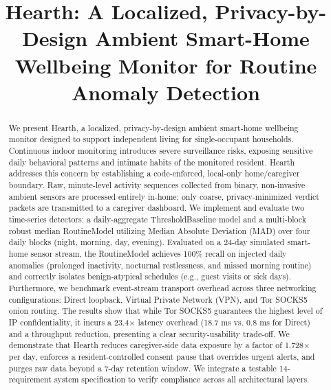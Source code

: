 \documentclass[conference]{IEEEtran}
\begin{document}
\title{Hearth: A Localized, Privacy-by-Design Ambient Smart-Home Wellbeing Monitor for Routine Anomaly Detection}

\author{
}

\maketitle

\begin{abstract}
We present Hearth, a localized, privacy-by-design ambient smart-home wellbeing monitor designed to support independent living for single-occupant households. Continuous indoor monitoring introduces severe surveillance risks, exposing sensitive daily behavioral patterns and intimate habits of the monitored resident. Hearth addresses this concern by establishing a code-enforced, local-only home/caregiver boundary. Raw, minute-level activity sequences collected from binary, non-invasive ambient sensors are processed entirely in-home; only coarse, privacy-minimized verdict packets are transmitted to a caregiver dashboard. We implement and evaluate two time-series detectors: a daily-aggregate ThresholdBaseline model and a multi-block robust median RoutineModel utilizing Median Absolute Deviation (MAD) over four daily blocks (night, morning, day, evening). Evaluated on a 24-day simulated smart-home sensor stream, the RoutineModel achieves 100\% recall on injected daily anomalies (prolonged inactivity, nocturnal restlessness, and missed morning routine) and correctly isolates benign-atypical schedules (e.g., guest visits or sick days). Furthermore, we benchmark event-stream transport overhead across three networking configurations: Direct loopback, Virtual Private Network (VPN), and Tor SOCKS5 onion routing. The results show that while Tor SOCKS5 guarantees the highest level of IP confidentiality, it incurs a 23.4$\times$ latency overhead (18.7 ms vs. 0.8 ms for Direct) and a throughput reduction, presenting a clear security-usability trade-off. We demonstrate that Hearth reduces caregiver-side data exposure by a factor of 1,728$\times$ per day, enforces a resident-controlled consent pause that overrides urgent alerts, and purges raw data beyond a 7-day retention window. We integrate a testable 14-requirement system specification to verify compliance across all architectural layers.
\end{abstract}
\end{document}
